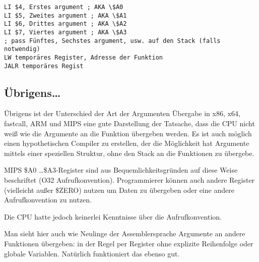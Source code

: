 \begin{lstlisting}[caption=MIPS (O32 calling convention),style=customasmMIPS]
LI $4, Erstes argument ; AKA \$A0
LI $5, Zweites argument ; AKA \$A1
LI $6, Drittes argument ; AKA \$A2
LI $7, Viertes argument ; AKA \$A3
; pass Fünftes, Sechstes argument, usw. auf den Stack (falls notwendig)
LW temporäres Register, Adresse der Funktion
JALR temporäres Regist
\end{lstlisting}

\subsection{Übrigens\dots{}}

Übrigens ist der Unterschied der Art der Argumenten Übergabe in x86, x64, fastcall, ARM und MIPS eine gute
Darstellung der Tatsache, dass die CPU nicht weiß wie die Argumente an die Funktion übergeben werden.
Es ist auch möglich einen hypothetischen Compiler zu erstellen, der die Möglichkeit hat Argumente mittels
einer speziellen Struktur, ohne den Stack an die Funktionen zu übergebe.

MIPS \$A0 \dots \$A3-Register sind aus Bequemlichkeitsgründen auf diese Weise beschriftet (O32 Aufrufkonvention).
Programmierer können auch andere Register (vielleicht außer \$ZERO) nutzen um Daten zu übergeben
oder eine andere Aufrufkonvention zu nutzen.

Die \ac{CPU} hatte jedoch keinerlei Kenntnisse über die Aufrufkonvention.

Man sieht hier auch wie Neulinge der Assemblersprache Argumente an andere Funktionen übergeben:
in der Regel per Register ohne explizite Reihenfolge oder globale Variablen.
Natürlich funktioniert das ebenso gut.
